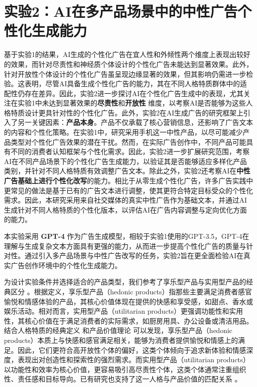\section{实验2：AI在多产品场景中的中性广告个性化生成能力}
基于实验1的结果，AI生成的个性化广告在宜人性和外倾性两个维度上表现出较好的效果，而针对尽责性和神经质个体设计的个性化广告未能达到显著效果。此外，针对开放性个体设计的个性化广告虽呈现边缘显著的效果，但其影响仍需进一步检验。这表明，尽管AI具备生成个性化广告的能力，其在不同人格特质群体中的适配性仍存在差异。因此，实验2进一步探讨AI在个性化广告生成中的表现，尤其关注在实验1中未达到显著效果的\textbf{尽责性}和\textbf{开放性} 维度，以考察AI是否能够为这些人格特质设计更具针对性的个性化广告。此外，实验2在AI生成广告的研究框架上引入了另一关键因素：\textbf{产品本身}。产品不仅承载了核心营销信息，还影响了广告文本的内容和个性化策略。在实验1中，研究采用手机这一中性产品，以尽可能减少产品类型对个性化广告效果的潜在干扰。然而，在实际广告创作中，不同产品可能具有不同的消费者认知框架与个性化需求。因此，实验2进一步扩展研究范围，考察AI在不同产品场景下的个性化广告生成能力，以验证其是否能够适应多样化产品类别，并针对不同人格特质有效调整广告文本。除此之外，实验2还考察AI在\textbf{中性广告基础上进行个性化改写}的能力。相比于从零生成个性化广告，许多广告实践中更常见的做法是基于已有的广告文本进行调整，使其更符合特定目标受众的个性化需求。因此，本研究采用来自社交媒体的真实中性广告作为基础文本，并通过AI生成针对不同人格特质的个性化版本，以评估AI在广告内容调整与定向优化方面的能力。

本实验采用 \textbf{GPT-4} 作为广告生成模型，相较于实验1使用的GPT-3.5，GPT-4在理解与生成复杂文本方面具有更强的能力，从而进一步提高个性化广告的质量与针对性。通过引入多产品场景与中性广告改写的任务，实验2旨在更全面检验AI在真实广告创作环境中的个性化生成能力。

为设计实验条件并选择适合的产品类型，我们参考了享乐型产品与实用型产品的经典区分 \citep{crowley1992measuring}。根据定义，享乐型产品（hedonic products）指那些主要满足消费者感官愉悦和情感体验的产品，其核心价值体现在提供的快感和享受感，如甜点、香水或娱乐活动。相对而言，实用型产品（utilitarian products）更强调功能性和实用性，其核心价值在于满足消费者的实际需求，如厨房用具、办公设备或清洁用品。结合人格特质的经典定义 \citep{john1991big} 和产品价值理论 \citep{dhar2000consumer} 可以发现，享乐型产品（hedonic products）本质上与快感和感官满足相关，能够为消费者提供愉悦和情感上的满足。因此，它们更符合高开放性个体的偏好，这类个体倾向于追求新体验和情感深度，表现出对创造性和探索性的强烈需求。而实用型产品（utilitarian products）以功能性和效率为核心价值，更容易吸引高尽责性个体，这类个体通常注重组织性、责任感和目标导向。已有研究也支持了这一人格与产品价值的匹配关系 \citep{guido2006shopping,huang2010relationship}。

